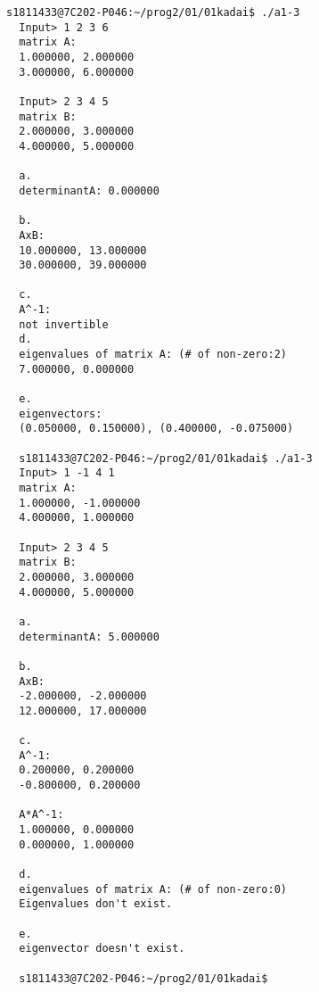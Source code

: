 \documentclass[10pt,a4paper]{jsarticle}
\begin{document}
\begin{lstlisting}[basicstyle=\ttfamily\footnotesize,frame=single]
  s1811433@7C202-P046:~/prog2/01/01kadai$ ./a1-3
  Input> 1 2 3 6
  matrix A:
  1.000000, 2.000000
  3.000000, 6.000000

  Input> 2 3 4 5
  matrix B:
  2.000000, 3.000000
  4.000000, 5.000000

  a.
  determinantA: 0.000000

  b.
  AxB:
  10.000000, 13.000000
  30.000000, 39.000000

  c.
  A^-1:
  not invertible
  d.
  eigenvalues of matrix A: (# of non-zero:2)
  7.000000, 0.000000

  e.
  eigenvectors:
  (0.050000, 0.150000), (0.400000, -0.075000)

  s1811433@7C202-P046:~/prog2/01/01kadai$ ./a1-3
  Input> 1 -1 4 1
  matrix A:
  1.000000, -1.000000
  4.000000, 1.000000

  Input> 2 3 4 5
  matrix B:
  2.000000, 3.000000
  4.000000, 5.000000

  a.
  determinantA: 5.000000

  b.
  AxB:
  -2.000000, -2.000000
  12.000000, 17.000000

  c.
  A^-1:
  0.200000, 0.200000
  -0.800000, 0.200000

  A*A^-1:
  1.000000, 0.000000
  0.000000, 1.000000

  d.
  eigenvalues of matrix A: (# of non-zero:0)
  Eigenvalues don't exist.

  e.
  eigenvector doesn't exist.

  s1811433@7C202-P046:~/prog2/01/01kadai$ 

\end{lstlisting}
\end{document}
